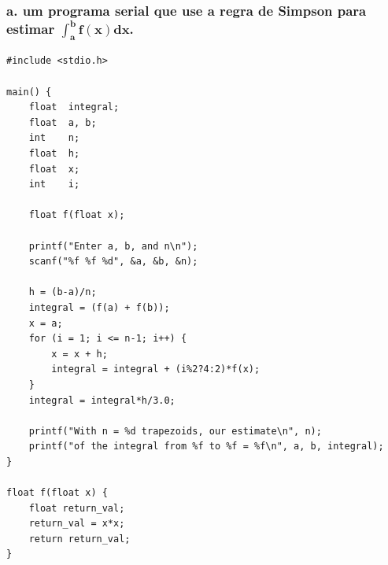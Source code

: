 \documentclass[11pt,a4paper,onecolumn]{article}
\begin{document}
\subsubsection*{a. um programa serial que use a regra de Simpson para estimar $\mathbf{\int_{a}^{b}f(x)dx}$.}
\begin{lstlisting}[style=cc]
#include <stdio.h>

main() {
    float  integral;
    float  a, b;
    int    n;
    float  h;
    float  x;
    int    i;

    float f(float x);

    printf("Enter a, b, and n\n");
    scanf("%f %f %d", &a, &b, &n);

    h = (b-a)/n;
    integral = (f(a) + f(b));
    x = a;
    for (i = 1; i <= n-1; i++) {
        x = x + h;
        integral = integral + (i%2?4:2)*f(x);
    }
    integral = integral*h/3.0;

    printf("With n = %d trapezoids, our estimate\n", n);
    printf("of the integral from %f to %f = %f\n", a, b, integral);
}

float f(float x) {
    float return_val;
    return_val = x*x;
    return return_val;
}
\end{lstlisting}
\end{document}
